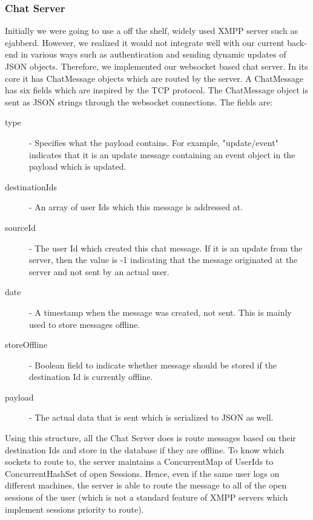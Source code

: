 \documentclass[10pt,a4paper]{article}
\begin{document}
\subsubsection{Chat Server}
Initially we were going to use a off the shelf, widely used XMPP server such as 
ejabberd. However, we realized it would not integrate well with our current 
back-end in various ways such as authentication and sending dynamic updates of 
JSON objects. Therefore, we implemented our websocket based chat server. In its 
core it has ChatMessage objects which are routed by the server. A ChatMessage 
has six fields which are inspired by the TCP protocol. The ChatMessage object is 
sent as JSON strings through the websocket connections. The fields are:
\begin{description}
\item[type] - Specifies what the payload contains. For example, "update/event" 
indicates that it is an update message containing an event object in the payload 
which is updated.
\item[destinationIds] - An array of user Ids which this message is addressed at.
\item[sourceId] - The user Id which created this chat message. If it is an 
update from the server, then the value is -1 indicating that the message 
originated at the server and not sent by an actual user.
\item[date] - A timestamp when the message was created, not sent. This is mainly 
used to store messages offline.
\item[storeOffline] - Boolean field to indicate whether message should be stored 
if the destination Id is currently offline.
\item[payload] - The actual data that is sent which is serialized to JSON as 
well.
\end{description}
\noindent Using this structure, all the Chat Server does is route messages based on their 
destination Ids and store in the database if they are offline. To know which 
sockets to route to, the server maintains a ConcurrentMap of UserIds to 
ConcurrentHashSet of open Sessions. Hence, even if the same user logs on 
different machines, the server is able to route the message to all of the open 
sessions of the user (which is not a standard feature of XMPP servers which 
implement sessions priority to route).
\end{document}

